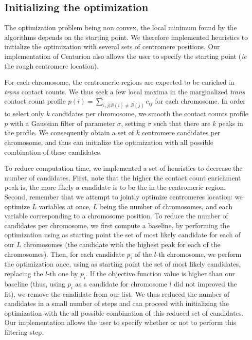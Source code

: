 \subsection*{Initializing the optimization}

The optimization problem being non convex, the local minimum found by the
algorithms depends on the starting point. We therefore implemented heuristics
to initialize the optimization with several sets of centromere positions. Our
implementation of Centurion also allows the user to specify the starting point
(\textit{ie} the rough centromere location).

For each chromosome, the centromeric regions are expected to be enriched in
\textit{trans} contact counts. We thus seek a few local maxima in the
marginalized \textit{trans} contact count profile $p(i) = \sum_{i, j |
\mathcal{B}(i) \neq \mathcal{B}(j)} c_{ij}$ for each chromosome. In order to
select only $k$ candidates per chromosome, we smooth the contact counts
profile $p$ with a Gaussian filter of parameter $\sigma$, setting $\sigma$
such that there are $k$ peaks in the profile. We consequently obtain a set of
$k$ centromere candidates per chromosome, and thus can initialize the
optimization with all possible combination of these candidates.

To reduce computation time, we implemented a set of heuristics to decrease the
number of candidates. First, note that the higher the contact count enrichment
peak is, the more likely a candidate is to be the in the centromeric region.
Second, remember that we attempt to jointly optimize centromeres location: we
optimize $L$ variables at once, $L$ being the number of chromosomes, and each
variable corresponding to a chromosome position. To reduce the number of
candidates per chromosome, we first compute a baseline, by performing the
optimization using as starting point the set of most likely candidate for each
of our $L$ chromosomes (the candidate with the highest
peak for each of the chromosomes). Then, for each candidate $p_i$ of the $l$-th
chromosome, we perform the optimization once, using as starting point the set
of most likely candidates, replacing the $l$-th one by $p_i$. If the objective
function value is higher than our baseline (thus, using $p_i$ as a candidate
for chromosome $l$ did not improved the fit), we remove the candidate from our
list. We thus reduced the number of candidates in a small number of steps and
can proceed with initializing the optimization with the all possible
combination of this reduced set of candidates. Our implementation allows the
user to specify whether or not to perform this filtering step.
